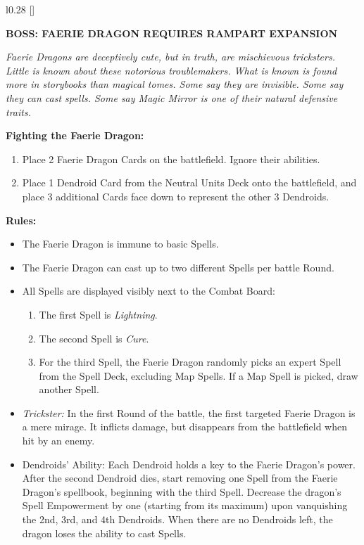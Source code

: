 \begin{wrapfigure}{l}{0.28\textwidth}
  \raisebox{0pt}[\dimexpr{}\baselineskip\relax]{}
\end{wrapfigure}
{
  \textbf{\MakeUppercase{Boss: Faerie Dragon {\scriptsize Requires Rampart Expansion}}}

  \medskip

  \textit{Faerie Dragons are deceptively cute, but in truth, are mischievous tricksters.
    Little is known about these notorious troublemakers.
    What is known is found more in storybooks than magical tomes.
    Some say they are invisible.
    Some say they can cast spells.
    Some say Magic Mirror is one of their natural defensive traits.
  }

  \medskip

  \textbf{Fighting the Faerie Dragon:}
  \begin{enumerate}
    \item Place 2 Faerie Dragon Cards on the battlefield.
      Ignore their abilities.
    \item Place 1 Dendroid Card from the  Neutral Units Deck onto the battlefield, and place 3 additional Cards face down to represent the other 3 Dendroids.
  \end{enumerate}

  \medskip

  \textbf{Rules:}
  \begin{itemize}
    \item The Faerie Dragon is immune to basic Spells.
    \item The Faerie Dragon can cast up to two different Spells per battle Round.
    \item All Spells are displayed visibly next to the Combat Board:
      \begin{enumerate}
        \item The first Spell is \textit{Lightning}.
        \item The second Spell is \textit{Cure}.
        \item For the third Spell, the Faerie Dragon randomly picks an expert Spell from the Spell Deck, excluding Map  Spells.
          If a Map  Spell is picked, draw another Spell.
      \end{enumerate}
    \item \textit{Trickster:} In the first Round of the battle, the first targeted Faerie Dragon is a mere mirage.
      It inflicts damage, but disappears from the battlefield when hit by an enemy.
    \item Dendroids' Ability: Each Dendroid holds a key to the Faerie Dragon's power.
      After the second Dendroid dies, start removing one Spell from the Faerie Dragon's spellbook, beginning with the third Spell.
      Decrease the dragon's Spell Empowerment  by one (starting from its maximum) upon vanquishing the 2nd, 3rd, and 4th Dendroids.
      When there are no Dendroids left, the dragon loses the ability to cast Spells.
  \end{itemize}
}

